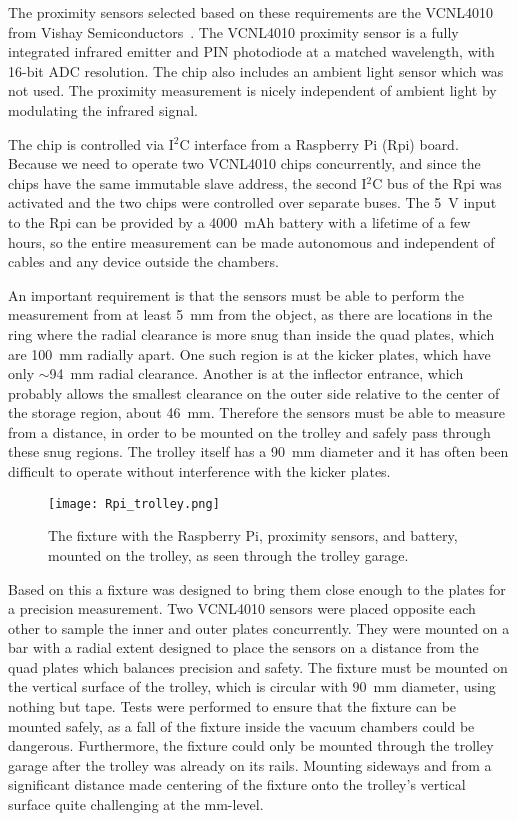 The proximity sensors selected based on these requirements are the VCNL4010 from Vishay Semiconductors~\cite{VCNL4010}. 
The VCNL4010 proximity sensor is a fully integrated infrared emitter and PIN photodiode at a matched wavelength, with 16-bit ADC resolution.
The chip also includes an ambient light sensor which was not used. The proximity measurement is nicely independent of ambient light by modulating the infrared signal. 

The chip is controlled via I$^2$C interface from a Raspberry Pi (Rpi) board. 
Because we need to operate two VCNL4010 chips concurrently, and since the chips have the same immutable slave address, the second I$^2$C bus of the Rpi was activated and the two chips were controlled over separate buses.
The \SI{5}{V} input to the Rpi can be provided by a \SI{4000}{mAh} battery with a lifetime of a few hours, so the entire measurement can be made autonomous and independent of cables and any device outside the chambers.

An important requirement is that the sensors must be able to perform the measurement from at least \SI{5}{mm} from the object, as there are locations in the ring where the radial clearance is more snug than inside the quad plates, which are \SI{100}{mm} radially apart.
One such region is at the kicker plates, which have only $\sim$\SI{94}{mm} radial clearance. Another is at the inflector entrance, which probably allows the smallest clearance on the outer side relative to the center of the storage region, about \SI{46}{mm}.
Therefore the sensors must be able to measure from a distance, in order to be mounted on the trolley and safely pass through these snug regions. The trolley itself has a \SI{90}{mm} diameter and it has often been difficult to operate without interference with the kicker plates.

\begin{figure}[]
	\centering
	\texttt{[image: Rpi\_trolley.png]}
	\caption{The fixture with the Raspberry Pi, proximity sensors, and battery, mounted on the trolley, as seen through the trolley garage.
	}\label{fig:Rpi_trolley}
\end{figure}


Based on this a fixture was designed to bring them close enough to the plates for a precision measurement. 
Two VCNL4010 sensors were placed opposite each other to sample the inner and outer plates concurrently. 
They were mounted on a bar with a radial extent designed to place the sensors on a distance from the quad plates which balances precision and safety. 
The fixture must be mounted on the vertical surface of the trolley, which is circular with \SI{90}{mm} diameter, using nothing but tape. Tests were performed to ensure that the fixture can be mounted safely, as a fall of the fixture inside the vacuum chambers could be dangerous. 
Furthermore, the fixture could only be mounted through the trolley garage after the trolley was already on its rails. Mounting sideways and from a significant distance made centering of the fixture onto the trolley's vertical surface quite challenging at the mm-level. 


